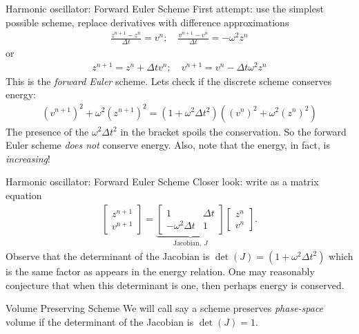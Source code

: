 \documentclass[pdf]{beamer}
\theoremstyle{definition}
\begin{document}
\begin{frame}{Harmonic oscillator: Forward Euler Scheme}
  First attempt: use the simplest possible scheme, replace derivatives
  with difference approximations
  \begin{align*}
    \frac{z^{n+1}-z^n}{\Delta t} = v^n; \quad \frac{v^{n+1}-v^n}{\Delta t} = -\omega^2 z^n
  \end{align*}
  or
  \begin{align*}
    z^{n+1} = z^n + \Delta t v^n; \quad v^{n+1} = v^n - \Delta t \omega^2 z^n
  \end{align*}
  This is the \emph{forward Euler} scheme. Lets check if the discrete
  scheme conserves energy:
  \begin{align*}
    (v^{n+1})^2 + \omega^2 (z^{n+1})^2 =
    (1+\omega^2 \Delta t^2)((v^{n})^2 + \omega^2 (z^{n})^2)
  \end{align*}
  The presence of the $\omega^2 \Delta t^2$ in the bracket spoils the
  conservation. So the forward Euler scheme \emph{does not} conserve
  energy. Also, note that the energy, in fact, is \emph{increasing}!
\end{frame}

\begin{frame}{Harmonic oscillator: Forward Euler Scheme}
  Closer look: write as a matrix equation
  \begin{align*}
    \left[
    \begin{matrix}
      z^{n+1} \\
      v^{n+1}
    \end{matrix}
    \right]
    =
    \underbrace{
    \left[
    \begin{matrix}
      1 & \Delta t \\
      -\omega^2 \Delta t & 1
    \end{matrix}
    \right]
    }_{\textrm{Jacobian},\ J}
    \left[
    \begin{matrix}
      z^{n} \\
      v^{n}
    \end{matrix}
    \right].                        
  \end{align*}
  Observe that the determinant of the Jacobian is
  $\det(J)=(1+\omega^2\Delta t^2)$ which is the same factor as appears
  in the energy relation. One may reasonably conjecture that when this
  determinant is one, then perhaps energy is conserved.

  \begin{block}{Volume Preserving Scheme}
    We will call say a scheme preserves \emph{phase-space} volume
    if the determinant of the Jacobian is $\det(J)=1$.
  \end{block}

\end{frame}
\end{document}

